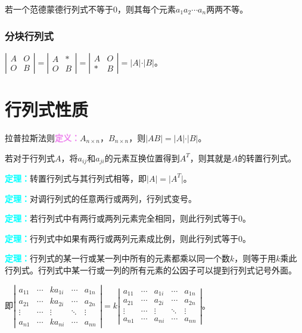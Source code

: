 \documentclass[UTF8, 12pt]{ctexart}
\begin{document}
若一个范德蒙德行列式不等于0，则其每个元素$a_1a_2\cdots a_n$两两不等。

\subsubsection{分块行列式}

$\left|\begin{array}{cc}
    A & O \\
    O & B
\end{array}\right|=
\left|\begin{array}{cc}
    A & * \\
    O & B
\end{array}\right|=
\left|\begin{array}{cc}
    A & O \\
    * & B
\end{array}\right|=\vert A\vert\cdot\vert B\vert$。

\section{行列式性质}

拉普拉斯法则\textcolor{violet}{\textbf{定义：}}$A_{n\times n}$，$B_{n\times n}$，则$\vert AB\vert=\vert A\vert\cdot\vert B\vert$。

若对于行列式$A$，将$a_{ij}$和$a_{ji}$的元素互换位置得到$A^T$，则其就是$A$的转置行列式。

\textcolor{aqua}{\textbf{定理：}}转置行列式与其行列式相等，即$\vert A\vert=\vert A^T\vert$。

\textcolor{aqua}{\textbf{定理：}}对调行列式的任意两行或两列，行列式变号。

\textcolor{aqua}{\textbf{定理：}}若行列式中有两行或两列元素完全相同，则此行列式等于0。

\textcolor{aqua}{\textbf{定理：}}行列式中如果有两行或两列元素成比例，则此行列式等于0。

\textcolor{aqua}{\textbf{定理：}}行列式的某一行或某一列中所有的元素都乘以同一个数$k$，则等于用$k$乘此行列式。行列式中某一行或一列的所有元素的公因子可以提到行列式记号外面。

即$
\left|\begin{array}{ccccc} 
    a_{11} & \cdots & ka_{1i} & \cdots & a_{1n} \\
    a_{21} & \cdots & ka_{2i} & \cdots & a_{2n} \\
    \vdots & \cdots & \vdots & \ddots & \vdots \\
    a_{n1} & \cdots & ka_{ni} & \cdots & a_{nn}
\end{array}\right| 
=k\left|\begin{array}{ccccc} 
    a_{11} & \cdots & a_{1i} & \cdots & a_{1n} \\
    a_{21} & \cdots & a_{2i} & \cdots & a_{2n} \\
    \vdots & \cdots & \vdots & \ddots & \vdots \\
    a_{n1} & \cdots & a_{ni} & \cdots & a_{nn}
\end{array}\right|$。
\end{document}
